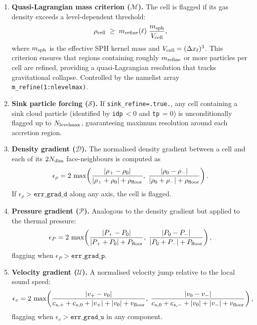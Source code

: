 \documentclass[fleqn,usenatbib]{mnras}
\newcommand{\dx}{\Delta x}
\newcommand{\nlevelmax}{N_{\rm levelmax}}
\newcommand{\code}[1]{\texttt{#1}}
\begin{document}
\begin{enumerate}

\item \textbf{Quasi-Lagrangian mass criterion ($\mathcal{M}$).}
  The cell is flagged if its gas density exceeds a
  level-dependent threshold:
  \begin{equation}
    \rho_{\rm cell} \;\ge\; m_{\rm refine}(\ell)
      \;\frac{m_{\rm sph}}{V_{\rm cell}},
  \end{equation}
  where $m_{\rm sph}$ is the effective SPH kernel mass and
  $V_{\rm cell} = (\dx_\ell)^3$.
  This criterion ensures that regions containing roughly
  $m_{\rm refine}$ or more particles per cell are refined,
  providing a quasi-Lagrangian resolution that tracks gravitational
  collapse.  Controlled by the namelist array
  \code{m\_refine(1:nlevelmax)}.

\item \textbf{Sink particle forcing ($\mathcal{S}$).}
  If \code{sink\_refine=.true.}, any cell containing a sink cloud
  particle (identified by \code{idp}$\,< 0$ and \code{tp}$\,= 0$) is
  unconditionally flagged up to $\nlevelmax$, guaranteeing maximum
  resolution around each accretion region.

\item \textbf{Density gradient ($\mathcal{D}$).}
  The normalised density gradient between a cell and each of its
  $2N_{\rm dim}$ face-neighbours is computed as
  \begin{equation}
    \epsilon_\rho = 2\,\max\!\left(
      \frac{|\rho_+ - \rho_0|}{|\rho_+ + \rho_0| + \rho_{\rm floor}},\;
      \frac{|\rho_0 - \rho_-|}{|\rho_0 + \rho_-| + \rho_{\rm floor}}
    \right).
  \end{equation}
  If $\epsilon_\rho > \code{err\_grad\_d}$ along any axis, the cell
  is flagged.

\item \textbf{Pressure gradient ($\mathcal{P}$).}
  Analogous to the density gradient but applied to the thermal
  pressure:
  \begin{equation}
    \epsilon_P = 2\,\max\!\left(
      \frac{|P_+ - P_0|}{|P_+ + P_0| + P_{\rm floor}},\;
      \frac{|P_0 - P_-|}{|P_0 + P_-| + P_{\rm floor}}
    \right),
  \end{equation}
  flagging when $\epsilon_P > \code{err\_grad\_p}$.

\item \textbf{Velocity gradient ($\mathcal{U}$).}
  A normalised velocity jump relative to the local sound speed:
  \begin{equation}
    \epsilon_v = 2\,\max\!\left(
      \frac{|v_+ - v_0|}{c_{s,+} + c_{s,0} + |v_+| + |v_0|
                          + v_{\rm floor}},\;
      \frac{|v_0 - v_-|}{c_{s,0} + c_{s,-} + |v_0| + |v_-|
                          + v_{\rm floor}}
    \right),
  \end{equation}
  flagging when $\epsilon_v > \code{err\_grad\_u}$ in any component.


\end{enumerate}
\end{document}
